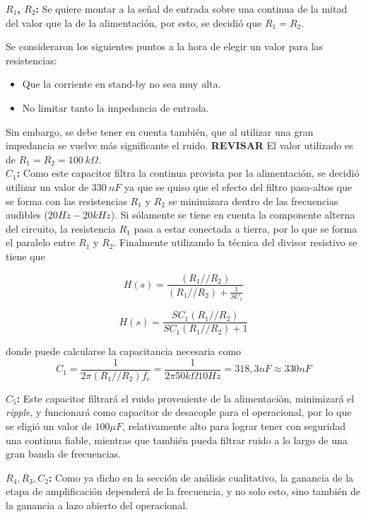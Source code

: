 \textbf{$R_1$, $R_2$:} Se quiere montar a la señal de entrada sobre una continua de la mitad del valor que la de la alimentación, por esto, se decidió que $R_1=R_2$.

Se consideraron los siguientes puntos a la hora de elegir un valor para las resistencias:
\begin{itemize}
\item Que la corriente en stand-by no sea muy alta.
\item No limitar tanto la impedancia de entrada.
\end{itemize}
Sin embargo, se debe tener en cuenta también, que al utilizar una gran impedancia se vuelve más significante el ruido. \textbf{REVISAR}
El valor utilizado es de $R_1=R_2=100 \ k\Omega$.\\

\textbf{$C_1$:} Como este capacitor filtra la continua provista por la alimentación, se decidió utilizar un valor de $330 \ nF$ ya que se quiso que el efecto del filtro pasa-altos que se forma con las resistencias $R_1$ y $R_2$ se minimizara dentro de las frecuencias audibles ($20Hz-20kHz$).
Si sólamente se tiene en cuenta la componente alterna del circuito, la resistencia $R_1$ pasa a estar conectada a tierra, por lo que se forma el paralelo entre $R_1$ y $R_2$. Finalmente utilizando la técnica del divisor resistivo se tiene que

\begin{equation}
H(s) = \frac{(R_1//R_2)}{(R_1//R_2) + \frac{1}{SC_1}}
\end{equation}

\begin{equation}
H(s) = \frac{SC_1(R_1//R_2)}{SC_1(R_1//R_2) + 1}
\end{equation}

donde puede calcularse la capacitancia necesaria como
\begin{equation}
C_1=\frac{1}{2\pi (R_1//R_2) f_c} = \frac{1}{2\pi 50k\Omega 10Hz} = 318,3nF \approx 330nF
\end{equation}

\textbf{$C_5$:} Este capacitor filtrará el ruido proveniente de la alimentación, minimizará el \textit{ripple}, y funcionará como capacitor de desacople para el operacional, por lo que se eligió un valor de $100\mu F$, relativamente alto para lograr tener con seguridad una continua fiable, mientras que también pueda filtrar ruido a lo largo de una gran banda de frecuencias.

\textbf{$R_4, R_3, C_2$:} Como ya dicho en la sección de análisis cualitativo, la ganancia de la etapa de amplificación dependerá de la frecuencia, y no solo esto, sino también de la ganancia a lazo abierto del operacional.

